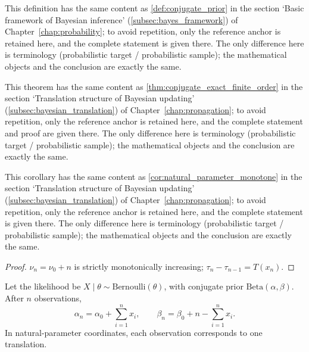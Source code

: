 \begin{definition}\label{def:conjugate_prior_prob}
This definition has the same content as \cref{def:conjugate_prior} in the section `Basic framework of Bayesian inference' (\cref{subsec:bayes_framework}) of Chapter~\ref{chap:probability}; to avoid repetition, only the reference anchor is retained here, and the complete statement is given there. The only difference here is terminology (probabilistic target / probabilistic sample); the mathematical objects and the conclusion are exactly the same.
\end{definition}

\begin{theorem}\label{thm:conjugate_exact_finite_order_prob}
This theorem has the same content as \cref{thm:conjugate_exact_finite_order} in the section `Translation structure of Bayesian updating' (\cref{subsec:bayesian_translation}) of Chapter~\ref{chap:propagation}; to avoid repetition, only the reference anchor is retained here, and the complete statement and proof are given there. The only difference here is terminology (probabilistic target / probabilistic sample); the mathematical objects and the conclusion are exactly the same.
\end{theorem}

\begin{corollary}\label{cor:natural_param_monotone_prob}
This corollary has the same content as \cref{cor:natural_parameter_monotone} in the section `Translation structure of Bayesian updating' (\cref{subsec:bayesian_translation}) of Chapter~\ref{chap:propagation}; to avoid repetition, only the reference anchor is retained here, and the complete statement is given there. The only difference here is terminology (probabilistic target / probabilistic sample); the mathematical objects and the conclusion are exactly the same.
\end{corollary}

\begin{proof}
$\nu_n=\nu_0+n$ is strictly monotonically increasing; $\tau_n-\tau_{n-1}=T(x_n)$.
\end{proof}

\begin{example}\label{ex:beta_binomial_prob}
Let the likelihood be $X\mid\theta\sim\mathrm{Bernoulli}(\theta)$, with conjugate prior $\mathrm{Beta}(\alpha,\beta)$. After $n$ observations,
\[
\alpha_n=\alpha_0+\sum_{i=1}^nx_i,\qquad \beta_n=\beta_0+n-\sum_{i=1}^nx_i.
\]
In natural-parameter coordinates, each observation corresponds to one translation.
\end{example}

